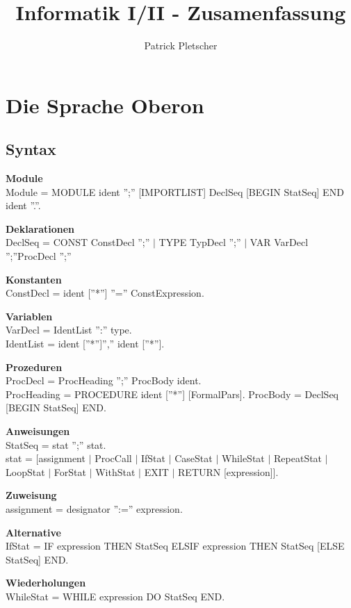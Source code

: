 \documentclass[10pt, a4paper, twocolumn]{scrartcl}
\title{Informatik I/II - Zusamenfassung}
\author{Patrick Pletscher}
\begin{document}
\maketitle

\section{Die Sprache Oberon}

\subsection{Syntax}

\begin{description}
 \item {\bf Module}\\
 Module = MODULE ident '';'' [IMPORTLIST] DeclSeq [BEGIN StatSeq] END ident ''.''.
 \item {\bf Deklarationen}\\
 DeclSeq = {CONST {ConstDecl '';''} $|$ TYPE {TypDecl '';''} $|$ VAR {VarDecl '';''}}{ProcDecl '';''}
 \item {\bf Konstanten}\\
 ConstDecl = ident [''*''] ''='' ConstExpression.
 \item {\bf Variablen}\\
 VarDecl = IdentList '':'' type.\\
 IdentList = ident [''*'']{'','' ident [''*'']}.
 \item {\bf Prozeduren}\\
 ProcDecl = ProcHeading '';'' ProcBody ident.\\
 ProcHeading = PROCEDURE ident [''*''] [FormalPars].
 ProcBody = DeclSeq [BEGIN StatSeq] END.
 \item {\bf Anweisungen}\\
 StatSeq = stat {'';'' stat}.\\
 stat = [assignment $|$ ProcCall $|$ IfStat $|$ CaseStat $|$ WhileStat $|$ RepeatStat $|$ LoopStat $|$ ForStat $|$ WithStat $|$ EXIT $|$ RETURN [expression]].
 \item {\bf Zuweisung}\\
 assignment = designator '':='' expression.
 \item {\bf Alternative}\\
 IfStat = IF expression THEN StatSeq {ELSIF expression THEN StatSeq} [ELSE StatSeq] END.
 \item {\bf Wiederholungen}\\
 WhileStat = WHILE expression DO StatSeq END.\\

\end{description}
\end{document}
